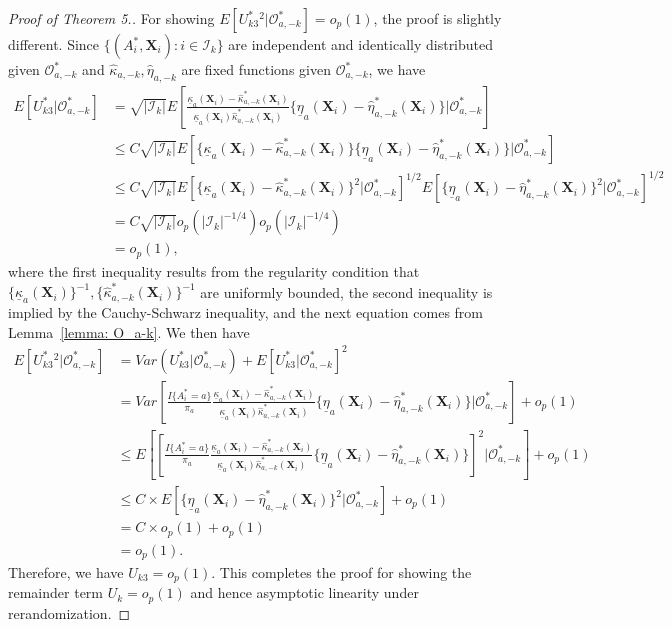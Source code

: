 \documentclass[12pt]{article}
\newcommand{\bX}{\boldsymbol{X}}
\begin{document}
\begin{proof}[Proof of Theorem 5.]
For showing $E[U_{k3}^*{}^2|\mathcal{O}^*_{a,-k}] = o_p(1)$, the proof is slightly different. Since $\{(A_i^*,\bX_i): i\in \mathcal{I}_k\}$ are independent and identically distributed given $\mathcal{O}_{a,-k}^*$ and $\widehat{\kappa}_{a,-k}, \widehat{\eta}_{a,-k}$ are fixed functions given $\mathcal{O}_{a,-k}^*$, we have
\begin{align*}
    E[U_{k3}^*|\mathcal{O}^*_{a,-k}] &= \sqrt{|\mathcal{I}_k|} E\left[\frac{\underline{\kappa}_a(\bX_i) - \widehat{\kappa} _{a,-k}^*(\bX_i)}{\underline{\kappa}_a(\bX_i)\widehat{\kappa}_{a,-k}^*(\bX_i)}\{\underline{\eta}_{a}(\bX_i)-\widehat{\eta}_{a,-k}^*(\bX_i)\}\bigg|\mathcal{O}^*_{a,-k}\right] \\
    &\le C \sqrt{|\mathcal{I}_k|} E\left[\{\underline{\kappa}_a(\bX_i) - \widehat{\kappa} _{a,-k}^*(\bX_i)\}\{\underline{\eta}_{a}(\bX_i)-\widehat{\eta}_{a,-k}^*(\bX_i)\}\bigg|\mathcal{O}^*_{a,-k}\right] \\
    &\le  C \sqrt{|\mathcal{I}_k|} E\left[\{\underline{\kappa}_a(\bX_i) - \widehat{\kappa} _{a,-k}^*(\bX_i)\}^2\bigg|\mathcal{O}^*_{a,-k}\right]^{1/2}E\left[\{\underline{\eta}_{a}(\bX_i)-\widehat{\eta}_{a,-k}^*(\bX_i)\}^2\bigg|\mathcal{O}^*_{a,-k}\right]^{1/2}\\
    &=  C \sqrt{|\mathcal{I}_k|} o_p(|\mathcal{I}_k|^{-1/4})  o_p(|\mathcal{I}_k|^{-1/4})\\
    &= o_p(1),
\end{align*}
where the first inequality results from the regularity condition that $\{\underline{\kappa}_a(\bX_i)\}^{-1}, \{\widehat{\kappa} _{a,-k}^*(\bX_i)\}^{-1}$ are uniformly bounded, the second inequality is implied by the Cauchy-Schwarz inequality, and the next equation comes from Lemma~\ref{lemma: O_a-k}. We then have
\begin{align*}
    E[U_{k3}^*{}^2|\mathcal{O}^*_{a,-k}] &= Var(U_{k3}^*|\mathcal{O}^*_{a,-k}) + E[U_{k3}^*|\mathcal{O}^*_{a,-k}]^2\\
    &= Var\left[ \frac{I\{A_i^*=a\}}{\pi_a} \frac{\underline{\kappa}_a(\bX_i) - \widehat{\kappa} _{a,-k}^*(\bX_i)}{\underline{\kappa}_a(\bX_i)\widehat{\kappa}_{a,-k}^*(\bX_i)}\{\underline{\eta}_{a}(\bX_i)-\widehat{\eta}_{a,-k}^*(\bX_i)\}\bigg| \mathcal{O}_{a,-k}^*\right] +o_p(1)\\
    &\le E\left[\left[\frac{I\{A_i^*=a\}}{\pi_a} \frac{\underline{\kappa}_a(\bX_i) - \widehat{\kappa} _{a,-k}^*(\bX_i)}{\underline{\kappa}_a(\bX_i)\widehat{\kappa}_{a,-k}^*(\bX_i)}\{\underline{\eta}_{a}(\bX_i)-\widehat{\eta}_{a,-k}^*(\bX_i)\}\right]^2\bigg| \mathcal{O}_{a,-k}^*\right] + o_p(1) \\
    &\le C\times E[\{\underline{\eta}_{a}(\bX_i)-\widehat{\eta}_{a,-k}^*(\bX_i)\}^2|\mathcal{O}_{a,-k}^*] + o_p(1)\\
    &= C\times o_p(1) + o_p(1)\\
    &= o_p(1).
\end{align*}
Therefore, we have $U_{k3} = o_p(1)$. This completes the proof for showing the remainder term $U_k = o_p(1)$ and hence asymptotic linearity under rerandomization. 


\end{proof}
\end{document}
